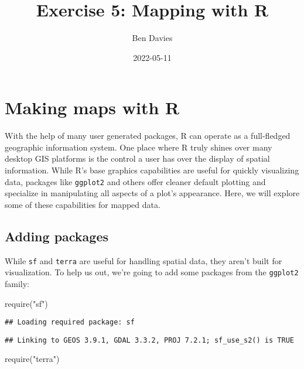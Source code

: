 \documentclass[
]{book}
\title{Exercise 5: Mapping with R}
\author{Ben Davies}
\date{2022-05-11}
\newenvironment{Shaded}{\begin{snugshade}}{\end{snugshade}}
\newcommand{\FunctionTok}[1]{\textcolor[rgb]{0.00,0.00,0.00}{#1}}
\newcommand{\NormalTok}[1]{#1}
\newcommand{\StringTok}[1]{\textcolor[rgb]{0.31,0.60,0.02}{#1}}
\begin{document}
\maketitle

{
\setcounter{tocdepth}{1}
\tableofcontents
}
\hypertarget{making-maps-with-r}{%
\chapter{Making maps with R}\label{making-maps-with-r}}

With the help of many user generated packages, R can operate as a full-fledged geographic information system. One place where R truly shines over many desktop GIS platforms is the control a user has over the display of spatial information. While R's base graphics capabilities are useful for quickly visualizing data, packages like \texttt{ggplot2} and others offer cleaner default plotting and specialize in manipulating all aspects of a plot's appearance. Here, we will explore some of these capabilities for mapped data.

\hypertarget{adding-packages}{%
\section{Adding packages}\label{adding-packages}}

While \texttt{sf} and \texttt{terra} are useful for handling spatial data, they aren't built for visualization. To help us out, we're going to add some packages from the \texttt{ggplot2} family:

\begin{Shaded}
\begin{Highlighting}[]
\FunctionTok{require}\NormalTok{(}\StringTok{"sf"}\NormalTok{)}
\end{Highlighting}
\end{Shaded}

\begin{verbatim}
## Loading required package: sf
\end{verbatim}

\begin{verbatim}
## Linking to GEOS 3.9.1, GDAL 3.3.2, PROJ 7.2.1; sf_use_s2() is TRUE
\end{verbatim}

\begin{Shaded}
\begin{Highlighting}[]
\FunctionTok{require}\NormalTok{(}\StringTok{"terra"}\NormalTok{)}
\end{Highlighting}
\end{Shaded}
\end{document}
